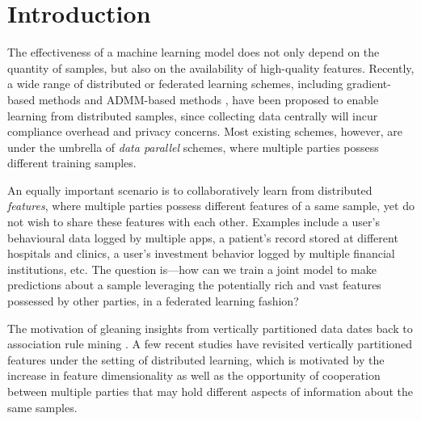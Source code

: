 \section{Introduction}



The effectiveness of a machine learning model does not only depend on the quantity of samples, but also on the availability of high-quality features.
Recently, a wide range of distributed or federated learning schemes, including gradient-based methods \cite{li2014communication,ho2013more} and ADMM-based methods \cite{zhang2018improving,zhang2016dual,huang2018dp},
have been proposed to enable learning from distributed samples, since collecting data centrally will incur compliance overhead and privacy concerns. Most existing schemes, however, are under the umbrella of \emph{data parallel} schemes, where multiple parties possess different training samples. 


An equally important scenario is to collaboratively learn from distributed \textit{features}, where multiple parties possess different features of a same sample, yet do not wish to share these features with each other. Examples include a user's behavioural data logged by multiple apps, a patient's record stored at different hospitals and clinics, a user's investment behavior logged by multiple financial institutions, etc. The question is---how can we train a joint model to make predictions about a sample leveraging the potentially rich and vast features possessed by other parties, in a federated learning fashion?

The motivation of gleaning insights from vertically partitioned data dates back to association rule mining \cite{vaidya2002privacy,vaidya2003privacy}. A few recent studies \cite{lou2018uplink,kenthapadi2013privacy,ying2018supervised,hu2019fdml,heinze2017preserving,dai2018privacy,bellet2015distributed} have revisited vertically partitioned features under the setting of distributed  learning, which is motivated by the increase in feature dimensionality as well as the opportunity of cooperation between multiple parties that may hold different aspects of information about the same samples. %

